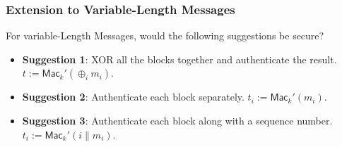 \begin{frame}\frametitle{Extension to Variable-Length Messages}
\begin{exampleblock}{For variable-Length Messages, would the following suggestions be secure?}
\begin{itemize}
\item \textbf{Suggestion 1}: XOR all the blocks together and authenticate the result. $t := \mathsf{Mac}_k'(\oplus_i m_i)$.
\item \textbf{Suggestion 2}: Authenticate each block separately. $t_i := \mathsf{Mac}_k'(m_i)$.
\item \textbf{Suggestion 3}: Authenticate each block along with a sequence number. $t_i := \mathsf{Mac}_k'(i\| m_i)$.
\end{itemize}
\end{exampleblock}
\end{frame}
